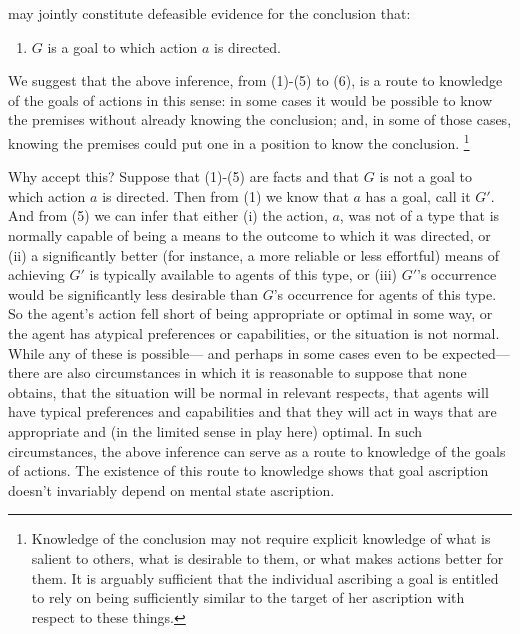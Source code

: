 \documentclass[12pt,\papersize]{extarticle}
\begin{document}
%
may jointly constitute defeasible evidence for the conclusion that:
%
\begin{enumerate}[resume]
\item $G$ is a goal to which action $a$ is directed.
\end{enumerate}
%
We suggest that the above inference, from (1)-(5) to (6), is a route to knowledge of the goals of actions in this sense:
in some cases
it would be possible to know the premises without already knowing the conclusion;
and, 
in some of those cases,
knowing the premises could put one in a position to know the conclusion.%
\footnote{
Knowledge of the conclusion may not require explicit knowledge of 
	what is salient to others,
	what is desirable to them,
	or what makes actions better for them.
It is arguably sufficient that
the individual ascribing a goal 
is entitled to 
rely on being sufficiently similar to the target of her ascription 
with respect to 
these things.
}

Why accept this?
Suppose that 
	(1)-(5) are facts 
and that
	$G$ is not a goal to which action $a$ is directed.
Then from (1) we know that $a$ has a goal, call it $G'$.
And from (5) we can infer that either 
(i) 
the action, $a$, was not of a type that is normally capable 
of being a means to the outcome to which it was directed,
or
(ii) 
a significantly better (for instance, a more reliable or less effortful) means of achieving $G'$ is typically available to agents of this type,
or
(iii)
$G'$'s occurrence would be significantly less desirable than $G$'s occurrence for agents of this type.
So the agent's action fell short of being appropriate or optimal in some way,
or the agent has atypical preferences or capabilities,
or the situation is not normal.
While any of these is possible---%
and perhaps in some cases even to be expected---%
there are also circumstances in which it is reasonable to suppose that none obtains,
that the situation will be normal in relevant respects,
that agents will have typical preferences and capabilities 
and that they will act in ways that are appropriate and (in the limited sense in play here) optimal.
In such circumstances, the above inference can serve as a route to knowledge of the goals of actions.
The existence of this route to knowledge shows that goal ascription doesn't invariably depend on mental state ascription.
\end{document}
